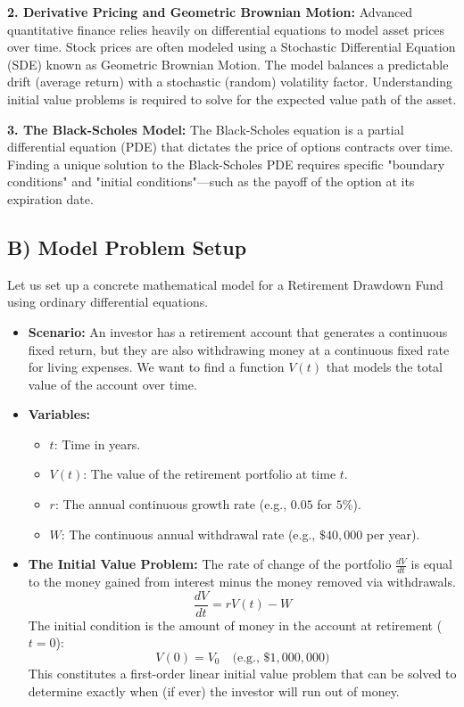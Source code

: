 \documentclass[12pt]{article}
\begin{document}
\textbf{2. Derivative Pricing and Geometric Brownian Motion:}
Advanced quantitative finance relies heavily on differential equations to model asset prices over time. Stock prices are often modeled using a Stochastic Differential Equation (SDE) known as Geometric Brownian Motion. The model balances a predictable drift (average return) with a stochastic (random) volatility factor. Understanding initial value problems is required to solve for the expected value path of the asset.

\textbf{3. The Black-Scholes Model:}
The Black-Scholes equation is a partial differential equation (PDE) that dictates the price of options contracts over time. Finding a unique solution to the Black-Scholes PDE requires specific "boundary conditions" and "initial conditions"—such as the payoff of the option at its expiration date.

\subsection{B) Model Problem Setup}
Let us set up a concrete mathematical model for a Retirement Drawdown Fund using ordinary differential equations. 
\begin{itemize}
    \item \textbf{Scenario:} An investor has a retirement account that generates a continuous fixed return, but they are also withdrawing money at a continuous fixed rate for living expenses. We want to find a function $V(t)$ that models the total value of the account over time.
    \item \textbf{Variables:} 
        \begin{itemize}
            \item $t$: Time in years.
            \item $V(t)$: The value of the retirement portfolio at time $t$.
            \item $r$: The annual continuous growth rate (e.g., $0.05$ for $5\%$).
            \item $W$: The continuous annual withdrawal rate (e.g., $\$40,000$ per year).
        \end{itemize}
    \item \textbf{The Initial Value Problem:}
    The rate of change of the portfolio $\frac{dV}{dt}$ is equal to the money gained from interest minus the money removed via withdrawals.
    \[ \frac{dV}{dt} = rV(t) - W \]
    The initial condition is the amount of money in the account at retirement ($t=0$):
    \[ V(0) = V_0 \quad \text{(e.g., } \$1,000,000 \text{)} \]
    This constitutes a first-order linear initial value problem that can be solved to determine exactly when (if ever) the investor will run out of money.
\end{itemize}
\end{document}
